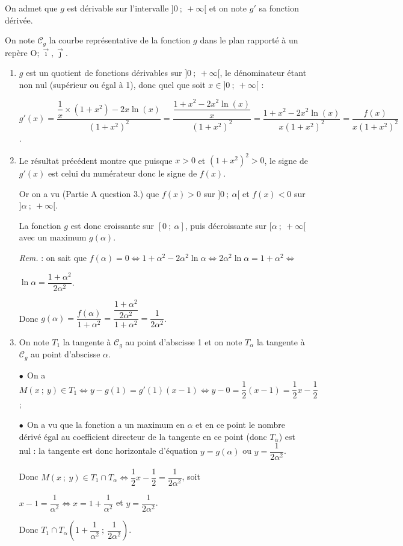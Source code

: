 \documentclass[10pt]{article}
\providecommand{\Oij}{\(\mathrm{O};\vec{\imath},\vec{\jmath}\)}
\begin{document}
On admet que $g$ est dérivable sur l'intervalle $]0~;~+ \infty[$ et on note $g'$ sa fonction dérivée.

On note $\mathcal{C}_g$ la courbe représentative de la fonction $g$ dans le plan rapporté à un repère \Oij.

\medskip

\begin{enumerate}
\item 
$g$ est un quotient de fonctions dérivables sur $]0~;~+ \infty[$, le dénominateur étant non nul (supérieur ou égal à 1), donc quel que soit $x \in ]0~;~+ \infty[$ :

$g'(x) = \dfrac{\dfrac 1x \times \left(1 + x^2\right) - 2x \ln (x)}{\left(1 + x^2\right)^2} = \dfrac{\dfrac{1 + x^2 - 2x^2\ln (x)}{x}}{\left(1 + x^2\right)^2}  = \dfrac{1 + x^2 - 2x^2\ln (x)}{x\left(1 + x^2\right)^2} = \dfrac{f(x)}{x\left(1 + x^2\right)^2}$.
\item 


Le résultat précédent montre que puisque $x > 0$ et $\left(1 + x^2\right)^2 > 0$, le signe de $g'(x)$ est celui du numérateur donc le signe de $f(x)$.

Or on a vu (Partie A question 3.) que $f(x) > 0$ sur $]0~;~\alpha[$ et $f(x) < 0$ sur $]\alpha~;~+ \infty[$.

La fonction $g$ est donc croissante sur $[0~;~\alpha]$, puis décroissante sur $[\alpha~;~+ \infty[$ avec un maximum $g(\alpha)$.

\emph{Rem.} : on sait que $f(\alpha) = 0 \iff 1 + \alpha^2 - 2\alpha^2 \ln \alpha \iff 2\alpha^2 \ln \alpha = 1 + \alpha^2 \iff $

$\ln \alpha = \dfrac{1 + \alpha^2}{2\alpha^2}$.

Donc $g(\alpha) = \dfrac{f(\alpha)}{1 + \alpha^2} = \dfrac{\dfrac{1 + \alpha^2}{2\alpha^2}}{1 + \alpha^2} = \dfrac{1}{2\alpha^2}$.
\item On note $T_1$ la tangente à $\mathcal{C}_g$ au point d'abscisse 1 et on note $T_{\alpha}$ la tangente à $\mathcal{C}_g$ au point d'abscisse $\alpha$.

$\bullet~~$On a $M(x~;~y) \in T_1 \iff y - g(1) = g'(1)(x - 1) \iff y - 0 = \dfrac12(x - 1) = \dfrac12 x - \dfrac12$ ;

$\bullet~~$On a vu que la fonction a un maximum en $\alpha$ et en ce point le nombre dérivé égal au coefficient directeur de la tangente en ce point (donc $T_{\alpha}$) est nul : la tangente est donc horizontale d'équation $y = g(\alpha)$ ou $y = \dfrac{1}{2\alpha^2}$. 


Donc $M(x~;~y) \in T_1 \cap T_{\alpha} \iff \dfrac12 x - \dfrac12 = \dfrac{1}{2\alpha^2}$, soit 

$x - 1 = \dfrac{1}{\alpha^2} \iff x = 1 + \dfrac{1}{\alpha^2}$ et $y = \dfrac{1}{2\alpha^2}$.

Donc $T_1 \cap T_{\alpha}\left(1 + \dfrac{1}{\alpha^2}~;~\dfrac{1}{2\alpha^2}\right)$.
\end{enumerate}

\bigskip
\end{document}
